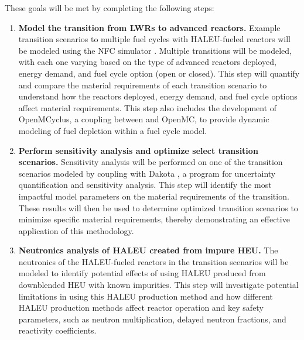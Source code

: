 These goals will be met by completing the following steps:
\vspace{0.2cm} 
\noindent
\begin{enumerate}
\item \textbf{Model the transition from \glspl{LWR} to advanced reactors.} 
Example transition scenarios to multiple fuel cycles with \gls{HALEU}-fueled 
reactors will 
be modeled using the \gls{NFC} simulator \Cyclus \cite{huff_fundamental_2016}. 
Multiple transitions will be modeled, with each one varying based on the type
of advanced reactors deployed, energy demand, and fuel cycle option 
(open or closed). This 
step will quantify and compare the material requirements of each transition 
scenario to understand how the reactors deployed, energy demand, and fuel cycle
options affect material requirements. This step also includes the 
development of OpenMCyclus, a coupling between \Cyclus and OpenMC, to 
provide dynamic modeling of fuel depletion within a fuel cycle model. 

\item \textbf{Perform sensitivity analysis and optimize select transition scenarios.}
Sensitivity analysis will be performed on one of the transition scenarios
modeled by coupling \Cyclus with Dakota \cite{adams_dakota_2021}, a program 
for uncertainty quantification and sensitivity analysis. This step 
will identify the most impactful model parameters on 
the material requirements of the transition. These results will then be 
used to determine optimized transition scenarios to minimize specific 
material requirements, thereby demonstrating an effective application of 
this methodology. 

\item \textbf{Neutronics analysis of \gls{HALEU} created from impure \gls{HEU}.}
The neutronics of the \gls{HALEU}-fueled reactors in the transition scenarios 
will be modeled to identify potential effects of using \gls{HALEU} produced 
from downblended \gls{HEU} with known impurities. This step will investigate 
potential limitations in using this \gls{HALEU} production method and 
how different \gls{HALEU} production methods affect reactor operation and 
key safety parameters, such as neutron multiplication, delayed neutron 
fractions, and reactivity coefficients.
\end{enumerate}


